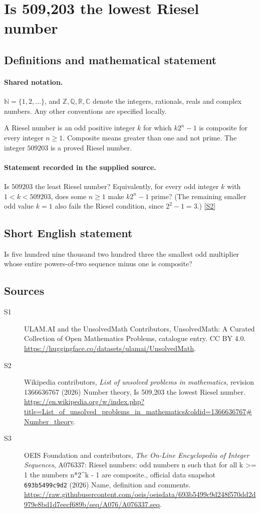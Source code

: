 \documentclass[11pt]{article}
\newcommand{\sref}[2]{\hyperlink{source:#1:#2}{[S#2]}}
\begin{document}
\section{Is 509,203 the lowest Riesel number}\label{statement}

\subsection{Definitions and mathematical statement}

\paragraph{Shared notation.}$\mathbb N=\{1,2,\ldots\}$, and $\mathbb Z,\mathbb Q,\mathbb R,\mathbb C$ denote the integers, rationals, reals and complex numbers. Any other conventions are specified locally.


A Riesel number is an odd positive integer $k$ for which $k2^n-1$ is composite for every integer $n\ge1$. Composite means greater than one and not prime. The integer $509203$ is a proved Riesel number.
\paragraph{Statement recorded in the supplied source.}
Is $509203$ the least Riesel number? Equivalently, for every odd integer $k$ with $1<k<509203$, does some $n\ge1$ make $k2^n-1$ prime? (The remaining smaller odd value $k=1$ also fails the Riesel condition, since $2^2-1=3$.) \sref{statement}{2}
\subsection{Short English statement}
Is five hundred nine thousand two hundred three the smallest odd multiplier whose entire powers-of-two sequence minus one is composite?
\subsection{Sources}
\begin{description}
\item[\hypertarget{source:statement:1}{S1}] ULAM.AI and the UnsolvedMath Contributors, UnsolvedMath: A Curated Collection of Open Mathematics Problems, catalogue entry. CC BY 4.0. \url{https://huggingface.co/datasets/ulamai/UnsolvedMath}.
\item[\hypertarget{source:statement:2}{S2}] Wikipedia contributors, \emph{List of unsolved problems in mathematics}, revision 1366636767 (2026) Number theory, Is 509,203 the lowest Riesel number. \url{https://en.wikipedia.org/w/index.php?title=List_of_unsolved_problems_in_mathematics&oldid=1366636767#Number_theory}.
\item[\hypertarget{source:statement:3}{S3}] OEIS Foundation and contributors, \emph{The On-Line Encyclopedia of Integer Sequences}, A076337: Riesel numbers: odd numbers n such that for all k >= 1 the numbers n*2\textasciicircum{}k - 1 are composite., official data snapshot \texttt{693b5499c9d2} (2026) Name, definition and comments. \url{https://raw.githubusercontent.com/oeis/oeisdata/693b5499c9d248f570dd2d979e8bd1d7eecf689b/seq/A076/A076337.seq}.
\end{description}
\label{end:statement}
\end{document}
